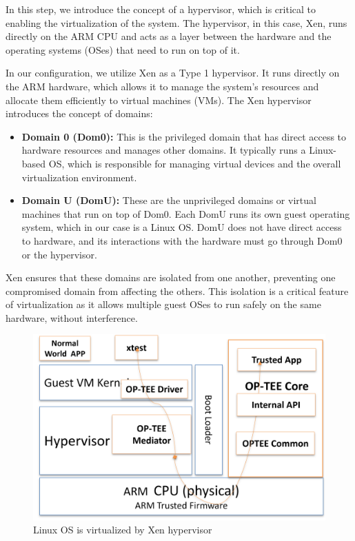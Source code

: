 \documentclass[acmtog]{acmart}
\begin{document}
In this step, we introduce the concept of a hypervisor, which is critical to enabling the virtualization of the system. The hypervisor, in this case, Xen, runs directly on the ARM CPU and acts as a layer between the hardware and the operating systems (OSes) that need to run on top of it. 

In our configuration, we utilize Xen as a Type 1 hypervisor. It runs directly on the ARM hardware, which allows it to manage the system's resources and allocate them efficiently to virtual machines (VMs). The Xen hypervisor introduces the concept of domains: 
\begin{itemize}
    \item \textbf{Domain 0 (Dom0):} This is the privileged domain that has direct access to hardware resources and manages other domains. It typically runs a Linux-based OS, which is responsible for managing virtual devices and the overall virtualization environment.
    \item \textbf{Domain U (DomU):} These are the unprivileged domains or virtual machines that run on top of Dom0. Each DomU runs its own guest operating system, which in our case is a Linux OS. DomU does not have direct access to hardware, and its interactions with the hardware must go through Dom0 or the hypervisor.
\end{itemize}

Xen ensures that these domains are isolated from one another, preventing one compromised domain from affecting the others. This isolation is a critical feature of virtualization as it allows multiple guest OSes to run safely on the same hardware, without interference.



\begin{figure}[ht]
  \centering
  \includegraphics[width=\columnwidth]{images/2.png}
  \caption{Linux OS is virtualized by Xen hypervisor}
  \label{fig:image_label}
\end{figure}
\end{document}

